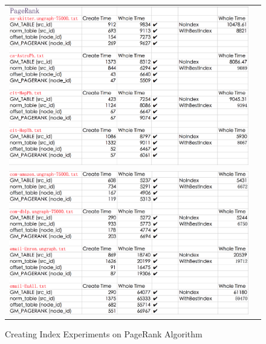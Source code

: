 \begin{figure}[H]
\begin{center}
\begin{tabular}{cc}
     \includegraphics[width=1.0\textwidth]{FIG/PR1.png} \\
     \includegraphics[width=1.0\textwidth]{FIG/PR2.png} \\
\end{tabular}
\caption{Creating Index Experiments on PageRank Algorithm}
\end{center}
\end{figure}


